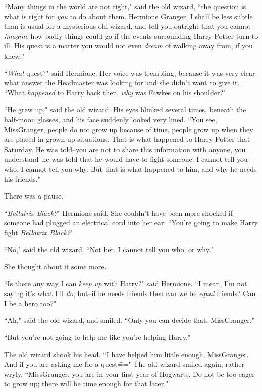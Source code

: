 ``Many things in the world are not right," said the old wizard, ``the question is what is right for \emph{you} to do about them. Hermione Granger, I shall be less subtle than is usual for a mysterious old wizard, and tell you outright that you cannot \emph{imagine} how badly things could go if the events surrounding Harry Potter turn to ill. His quest is a matter you would not even \emph{dream} of walking away from, if you knew."

``\emph{What} quest?" said Hermione. Her voice was trembling, because it was very clear what answer the Headmaster was looking for and she didn't want to give it. ``What \emph{happened} to Harry back then, \emph{why} was Fawkes on his shoulder?"

``He grew up," said the old wizard. His eyes blinked several times, beneath the half-moon glasses, and his face suddenly looked very lined. ``You see, Miss\?Granger, people do not grow up because of time, people grow up when they are placed in grown-up situations. That is what happened to Harry Potter that Saturday. He was told\---you are not to share this information with anyone, you understand\---he was told that he would have to fight someone. I cannot tell you who. I cannot tell you why. But that is what happened to him, and why he needs his friends."

There was a pause.

``\emph{Bellatrix Black?}" Hermione said. She couldn't have been more shocked if someone had plugged an electrical cord into her ear. ``You're going to make Harry fight \emph{Bellatrix Black?}"

``No," said the old wizard. ``Not her. I cannot tell you who, or why."

She thought about it some more.

``Is there any way I can \emph{keep up} with Harry?" said Hermione. ``I mean, I'm not saying it's what I'll \emph{do}, but\---if he needs friends then can we be \emph{equal} friends? Can I be a hero too?"

``Ah," said the old wizard, and smiled. ``Only you can decide that, Miss\?Granger."

``But you're not going to help me like you're helping Harry."

The old wizard shook his head. ``I have helped him little enough, Miss\?Granger. And if you are asking me for a quest\===" The old wizard smiled again, rather wryly. ``Miss\?Granger, you are in your first year of Hogwarts. Do not be too eager to grow up; there will be time enough for that later."

